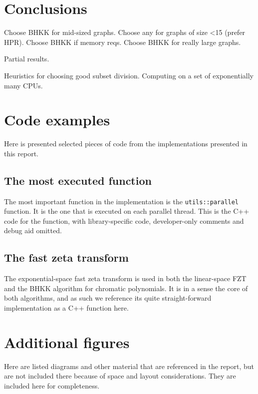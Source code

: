 \documentclass{cslthse-msc}
\newcommand{\code}{\texttt}
\begin{document}
\chapter{Conclusions}
Choose BHKK for mid-sized graphs.
Choose any for graphs of size <15 (prefer HPR).
Choose BHKK if memory reqs.
Choose BHKK for really large graphs.

Partial results.

Heuristics for choosing good subset division.
Computing on a set of exponentially many CPUs.




\begin{appendices}
 \chapter{Code examples}
 Here is presented selected pieces of code from the implementations presented in this report.
 
 \section{The most executed function}
 The most important function in the implementation is the \code{utils::parallel} function. It is the one that is executed on each parallel thread. This is the C++ code for the function, with library-specific code, developer-only comments and debug aid omitted.
 
 \section{The fast zeta transform}
 The exponential-space fast zeta transform is used in both the linear-space FZT and the BHKK algorithm for chromatic polynomials. It is in a sense the core of both algorithms, and as such we reference its quite straight-forward implementation as a C++ function here.
 
 
 \chapter{Additional figures}
 Here are listed diagrams and other material that are referenced in the report, but are not included there because of space and layout considerations. They are included here for completeness.
 

\end{appendices}
\end{document}
